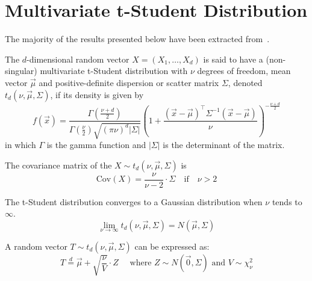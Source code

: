 \documentclass[11pt,fleqn]{book} %
\begin{document}
\section{Multivariate t-Student Distribution}
\label{ap:mtsd}

The majority of the results presented below have been extracted 
from~\cite{kotz:2004,demarta:2005}.

\begin{definition}
	The $d$-dimensional random vector $X=(X_1,\dots,X_d)$ is said to have a 
	(non-singular) multivariate t-Student distribution with $\nu$ degrees of 
	freedom, mean vector $\vec{\mu}$ and positive-definite dispersion or 
	scatter matrix $\Sigma$, denoted $t_d(\nu,\vec{\mu},\Sigma)$, if its 
	density is given by
	\begin{displaymath}
		f(\vec{x})=\frac{\Gamma\left(\frac{\nu+d}{2}\right)}
		{\Gamma\left(\frac{\nu}{2}\right)\sqrt{(\pi \nu)^d |\Sigma|}}
		\left(
		1+ \frac{(\vec{x}-\vec{\mu})^\top\Sigma^{-1}(\vec{x}-\vec{\mu})}{\nu}
		\right)^{-\frac{\nu+d}{2}}
	\end{displaymath}
	in which $\Gamma$ is the gamma function and $|\Sigma|$ is the 
	determinant of the matrix.
\end{definition}

\begin{proposition}
	The covariance matrix of the $X \sim t_d(\nu,\vec{\mu},\Sigma)$ is
	\begin{displaymath}
		\text{Cov}(X) = \frac{\nu}{\nu-2} \cdot \Sigma \quad \text{if} 
		\quad \nu > 2
	\end{displaymath}
\end{proposition}

\begin{proposition}
	The t-Student distribution converges to a Gaussian distribution 
	when $\nu$ tends to $\infty$.
	\begin{displaymath}
		\lim_{\nu \to \infty} t_d(\nu,\vec{\mu},\Sigma) = N(\vec{\mu},\Sigma)
	\end{displaymath}
\end{proposition}

\begin{proposition}
	\label{prop:mtschar}
	A random vector $T \sim t_d(\nu,\vec{\mu},\Sigma)$ can be expressed as:
	\begin{displaymath}
		T \stackrel{d}{=} \vec{\mu} + \sqrt{\frac{\nu}{V}}\cdot Z
		\quad \text{ where } Z \sim N(\vec{0},\Sigma) 
		\text{ and } V \sim \chi_{\nu}^2
	\end{displaymath}
\end{proposition}
\end{document}
